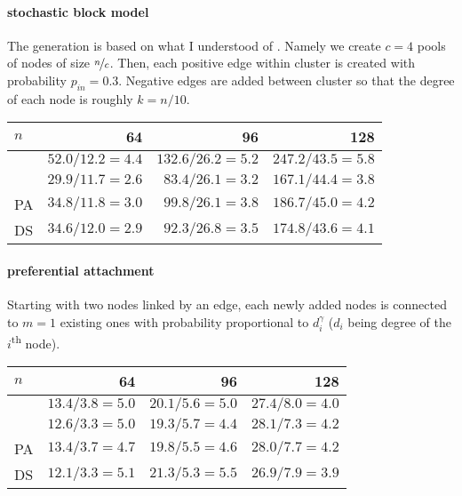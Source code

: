 \paragraph{stochastic block model} The generation is based on what I
understood of \autocites[section 3.3]{Yang2007}[section IV.A]{Jiang2015}.
Namely we create $c=4$ pools of nodes of size $\nicefrac{n}{c}$. Then, each
positive edge within cluster is created with probability $p_{in}=0.3$.
Negative edges are added between cluster so that the degree of each node is
roughly $k=n/10$.

\begin{center}
	\begin{tabular}{lrrr}
		\toprule
		$n$      & 64              & 96               & 128 \\
		\midrule
		\pot{} & $52.0/12.2=4.4$ & $132.6/26.2=5.2$ & $247.2/43.5=5.8$ \\
		\pat{} & $29.9/11.7=2.6$ & $83.4/26.1=3.2$  & $167.1/44.4=3.8$ \\
		PA     & $34.8/11.8=3.0$ & $99.8/26.1=3.8$  & $186.7/45.0=4.2$ \\
		DS     & $34.6/12.0=2.9$ & $92.3/26.8=3.5$  & $174.8/43.6=4.1$ \\
		\bottomrule
	\end{tabular}
\end{center}

\paragraph{preferential attachment} \autocite{Barabasi1999} Starting with two
nodes linked by an edge, each newly added nodes is connected to $m=1$ existing
ones with probability proportional to $d_i^{\gamma}$ ($d_i$ being degree of
the $i$\textsuperscript{th} node).

\begin{center}
	\begin{tabular}{lrrr}
		\toprule
		$n$      & 64             & 96             & 128 \\
		\midrule
		\pot{} & $13.4/3.8=5.0$ & $20.1/5.6=5.0$ & $27.4/8.0=4.0$ \\
		\pat{} & $12.6/3.3=5.0$ & $19.3/5.7=4.4$ & $28.1/7.3=4.2$ \\
		PA     & $13.4/3.7=4.7$ & $19.8/5.5=4.6$ & $28.0/7.7=4.2$ \\
		DS     & $12.1/3.3=5.1$ & $21.3/5.3=5.5$ & $26.9/7.9=3.9$ \\
		\bottomrule
	\end{tabular}
\end{center}

